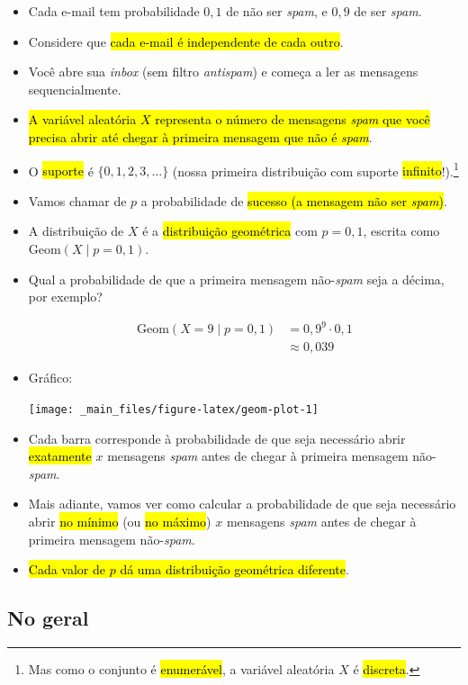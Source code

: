 \documentclass[
  11pt]{report}
\begin{document}
\begin{itemize}
\item
  Cada e-mail tem probabilidade $0{,}1$ de não ser \emph{spam}, e $0{,}9$ de ser \emph{spam}.
\item
  Considere que {\hl{cada e-mail é independente de cada outro}}.
\item
  Você abre sua \emph{inbox} (sem filtro \emph{antispam}) e começa a ler as mensagens sequencialmente.
\item
  {\hl{A variável aleatória $X$ representa o número de mensagens \emph{spam} que você precisa abrir até chegar à primeira mensagem que não é \emph{spam}}}.
\item
  O {\hl{suporte}} é $\{0, 1, 2, 3, \ldots \}$ (nossa primeira distribuição com suporte {\hl{infinito}}!).\footnote{Mas como o conjunto é {\hl{enumerável}}, a variável aleatória $X$ é {\hl{discreta}}.}
\item
  Vamos chamar de $p$ a probabilidade de {\hl{sucesso (a mensagem não ser \emph{spam})}}.
\item
  A distribuição de $X$ é a {\hl{distribuição geométrica}} com $p = 0{,}1$, escrita como $\text{Geom}(X \mid p = 0{,}1)$.
\item
  Qual a probabilidade de que a primeira mensagem não-\emph{spam} seja a décima, por exemplo?

  \[
  \begin{aligned}
  \text{Geom}(X = 9 \mid p = 0{,}1)  &= 0{,}9^9 \cdot 0{,}1 \\
                          &\approx 0{,}039 
  \end{aligned}
  \]
\item
  Gráfico:

  \begin{center}\texttt{[image: \_main\_files/figure-latex/geom-plot-1]} \end{center}
\item
  Cada barra corresponde à probabilidade de que seja necessário abrir {\hl{exatamente}} $x$ mensagens \emph{spam} antes de chegar à primeira mensagem não-\emph{spam}.
\item
  Mais adiante, vamos ver como calcular a probabilidade de que seja necessário abrir {\hl{no mínimo}} (ou {\hl{no máximo}}) $x$ mensagens \emph{spam} antes de chegar à primeira mensagem não-\emph{spam}.
\item
  {\hl{Cada valor de $p$ dá uma distribuição geométrica diferente}}.
\end{itemize}

\hypertarget{no-geral-3}{%
\subsection{No geral}\label{no-geral-3}}
\end{document}
